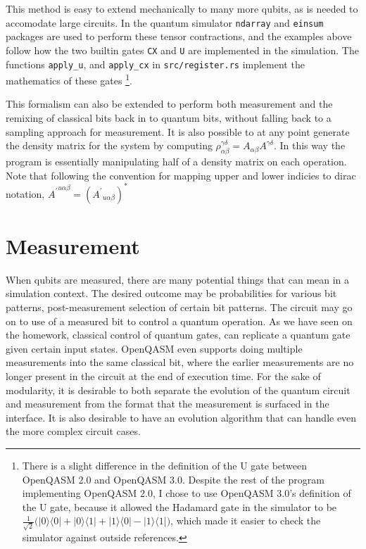 \documentclass[%
 reprint,
 amsmath,amssymb,
 aps,
]{revtex4-2}
\begin{document}
This method is easy to extend mechanically to many more qubits, as is needed to accomodate large circuits. In the quantum simulator \texttt{ndarray} and \texttt{einsum} packages are used to perform these tensor contractions, and the examples above follow how the two builtin gates \texttt{CX} and \texttt{U} are implemented in the simulation. The functions \texttt{apply\_u}, and \texttt{apply\_cx} in \texttt{src/register.rs} implement the mathematics of these gates \footnote{There is a slight difference in the definition of the U gate between OpenQASM 2.0 and OpenQASM 3.0.  Despite the rest of the program implementing OpenQASM 2.0, I chose to use OpenQASM 3.0's definition of the U gate, because it allowed the Hadamard gate in the simulator to be $\frac{1}{\sqrt{2}} \big( |0\rangle\langle0| + |0\rangle\langle1| + |1\rangle\langle0| - |1\rangle\langle1|\big)$, which made it easier to check the simulator against outside references.}. 

This formalism can also be extended to perform both measurement and the remixing of classical bits back in to quantum bits, without falling back to a sampling approach for measurement. It is also possible to at any point generate the density matrix for the system by computing $\rho_{\alpha\beta}^{\gamma\delta} = A_{\alpha\beta} A^{\gamma\delta}$. In this way the program is essentially manipulating half of a density matrix on each operation. Note that following the convention for mapping upper and lower indicies to dirac notation, ${A^\prime}^{u \alpha\beta}  = ({A^\prime}_{u \alpha\beta})^{\ast}$


\section{\label{sec:level1} Measurement}
When qubits are measured, there are many potential things that can mean in a simulation context. The desired outcome may be probabilities for various bit patterns, post-measurement selection of certain bit patterns. The circuit may go on to use of a measured bit to control a quantum operation. As we have seen on the homework, classical control of quantum gates, can replicate a quantum gate given certain input states. OpenQASM even supports doing multiple measurements into the same classical bit, where the earlier measurements are no longer present in the circuit at the end of execution time. For the sake of modularity, it is desirable to both separate the evolution of the quantum circuit and measurement from the format that the measurement is surfaced in the interface. It is also desirable to have an evolution algorithm that can handle even the more complex circuit cases.
\end{document}
